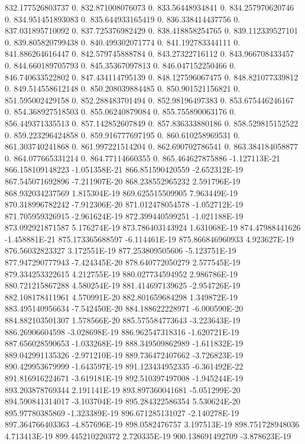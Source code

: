 832.177526803737  0.
832.871008076073  0.
833.56448934841  0.
834.257970620746  0.
834.951451893083  0.
835.644933165419  0.
836.338414437756  0.
837.031895710092  0.
837.725376982429  0.
838.418858254765  0.
839.112339527101  0.
839.805820799438  0.
840.499302071774  0.
841.192783344111  0.
841.886264616447  0.
842.579745888784  0.
843.27322716112  0.
843.966708433457  0.
844.660189705793  0.
845.35367097813  0.
846.047152250466  0.
846.740633522802  0.
847.434114795139  0.
848.127596067475  0.
848.821077339812  0.
849.514558612148  0.
850.208039884485  0.
850.901521156821  0.
851.595002429158  0.
852.288483701494  0.
852.98196497383  0.
853.675446246167  0.
854.368927518503  0.
855.06240879084  0.
855.755890063176  0.
856.449371335513  0.
857.142852607849  0.
857.836333880186  0.
858.529815152522  0.
859.223296424858  0.
859.916777697195  0.
860.610258969531  0.
861.303740241868  0.
861.997221514204  0.
862.690702786541  0.
863.384184058877  0.
864.077665331214  0.
864.77114660355  0.
865.464627875886  -1.127113E-21
866.158109148223  -1.051358E-21
866.851590420559  -2.652312E-19
867.545071692896  -7.211907E-20
868.238552965232  2.591796E-19
868.932034237569  1.815304E-19
869.625515509905  7.963449E-19
870.318996782242  -7.912306E-20
871.012478054578  -1.052712E-19
871.705959326915  -2.961624E-19
872.399440599251  -1.021188E-19
873.092921871587  5.176274E-19
873.786403143924  1.631068E-19
874.47988441626  -1.458881E-21
875.173365688597  -6.114461E-19
875.866846960933  4.923627E-19
876.56032823327  3.172551E-19
877.253809505606  -5.123751E-19
877.947290777943  -7.424345E-20
878.640772050279  2.577545E-19
879.334253322615  4.212755E-19
880.027734594952  2.986786E-19
880.721215867288  4.580254E-19
881.414697139625  -2.954726E-19
882.108178411961  4.570991E-20
882.801659684298  1.349872E-19
883.495140956634  -7.542450E-20
884.188622228971  -6.000590E-20
884.882103501307  1.578566E-20
885.575584773643  -3.223643E-19
886.26906604598  -3.028698E-19
886.962547318316  -1.620721E-19
887.656028590653  -1.033268E-19
888.349509862989  -1.611832E-19
889.042991135326  -2.971210E-19
889.736472407662  -3.726823E-19
890.429953679999  -1.643597E-19
891.123434952335  -6.361492E-22
891.816916224671  -3.619181E-19
892.510397497008  -1.945244E-19
893.203878769344  2.191141E-19
893.897360041681  -5.051299E-20
894.590841314017  -3.103704E-19
895.284322586354  5.530624E-20
895.97780385869  -1.323389E-19
896.671285131027  -2.140278E-19
897.364766403363  -4.857696E-19
898.0582476757  3.197513E-19
898.751728948036  4.713413E-19
899.445210220372  2.720335E-19
900.138691492709  -3.878623E-19
